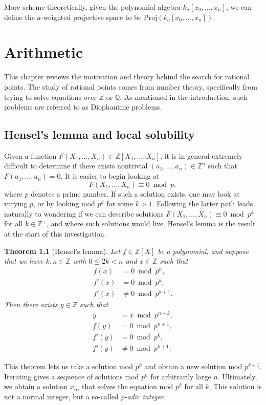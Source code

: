 \documentclass[12pt,twoside]{reedthesis}
\theoremstyle{plain}
\newtheorem{theorem}{Theorem}[chapter]
\theoremstyle{definition}
\theoremstyle{remark}
\newcommand{\ZZ}{\mathbb{Z}}
\newcommand{\QQ}{\mathbb{Q}}
\begin{document}
More scheme-theoretically, given the polynomial algebra $k_a[x_0,\ldots,x_n]$, we can define the $a$-weighted projective space to be $\text{Proj}(k_a[x_0,\ldots,x_n])$.
\chapter{Arithmetic}
This chapter reviews the motivation and theory behind the search for rational points. The study of rational points comes from number theory, specifically from trying to solve equations over $\ZZ$ or $\QQ$. As mentioned in the introduction, such problems are referred to as Diophantine problems.
\section{Hensel's lemma and local solubility}
Given a function $F(X_1,\ldots,X_n)\in\ZZ[X_1,\ldots,X_n]$, it is in general extremely difficult to determine if there exists nontrivial $(a_1,\ldots,a_n)\in\ZZ^n$ such that $F(a_1,\ldots,a_n)=0$. It is easier to begin looking at \[F(X_1,\ldots,X_n)\equiv0\bmod p,\] where $p$ denotes a prime number. If such a solution exists, one may look at varying $p$, or by looking mod $p^k$ for some $k>1$. Following the latter path leads naturally to wondering if we can describe solutions $F(X_1,\ldots,X_n)\equiv0\bmod p^k$ for all $k\in\ZZ^+$, and where such solutions would live. Hensel's lemma is the result at the start of this investigation.
\begin{theorem}[Hensel's lemma]
Let $f\in\ZZ[X]$ be a polynomial, and suppose that we have $k,n\in\ZZ$ with $0\leq2k<n$ and $x\in\ZZ$ such that
\begin{align*}
f(x)&=0\bmod p^n,\\
f'(x)&=0\bmod p^k,\\
f'(x)&\neq0\bmod p^{k+1}.
\end{align*}
Then there exists $y\in\ZZ$ such that 
\begin{align*}
y&=x\bmod p^{n-k},\\ f(y)&=0\bmod p^{n+1},\\ 
f'(y)&=0\bmod p^k,\\ f'(y)&\neq0\bmod p^{k+1}.
\end{align*}
\end{theorem}
\noindent This theorem lets us take a solution mod $p^k$ and obtain a new solution mod $p^{k+1}$. Iterating gives a sequence of solutions mod $p^n$ for arbitrarily large $n$. Ultimately, we obtain a solution $x_\infty$ that solves the equation mod $p^k$ for all $k$. This solution is not a normal integer, but a so-called \emph{$p$-adic integer}.
\end{document}
